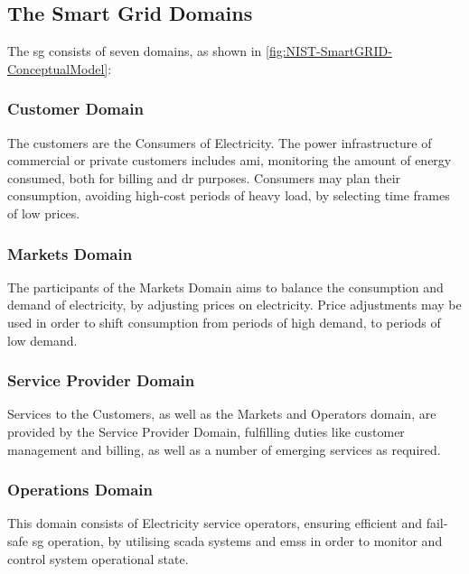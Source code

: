 




\subsection{The Smart Grid Domains}




The \acrshort{sg} consists of seven domains, as shown in \figureautorefname { }\ref{fig:NIST-SmartGRID-ConceptualModel}:


    \subsubsection{Customer Domain} The customers are the Consumers of Electricity.
    The power infrastructure of commercial or private customers includes \acrfull{ami}, monitoring the amount of energy consumed, both for billing and \acrfull{dr} purposes. Consumers may plan their consumption, avoiding high-cost periods of heavy load, by  selecting time frames of low prices.
    \subsubsection{Markets Domain} The participants of the Markets Domain aims to balance the consumption and demand of electricity, by adjusting prices on electricity. Price adjustments may be used in order to shift consumption from periods of high demand, to periods of low demand.     
    \subsubsection{Service Provider Domain} Services to the Customers,  as well as the Markets and Operators domain, are provided by the Service Provider Domain, fulfilling duties like customer management and billing, as well as a number of emerging services as required. 
    \subsubsection{Operations Domain} This domain consists of Electricity service operators, ensuring efficient and fail-safe \acrfull{sg} operation, by utilising \acrshort{scada} systems and \acrlong{ems}s in order to monitor and control system operational state.  
